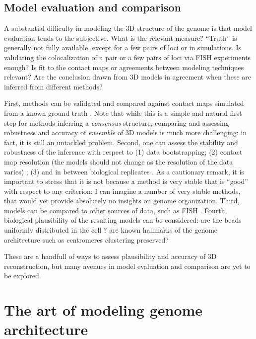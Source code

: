 \documentclass[2columns]{article}
\begin{document}
\subsection*{Model evaluation and comparison}

A substantial difficulty in modeling the 3D structure of the genome is that
model evaluation tends to the subjective. What is the relevant measure?
``Truth'' is generally not fully available, except for a few pairs of loci or
in simulations. Is validating the colocalization of a pair or a few pairs of
loci via FISH experiments enough? Is fit to the contact maps or agreements
between modeling techniques relevant? Are the conclusion drawn from 3D models
in agreement when these are inferred from different methods?

First, methods can be validated and compared against contact maps simulated
from a known ground truth \citep{zhang:inference, varoquaux:statistical,
lesne:3d, trieu:3D}. Note that while this is a simple and natural first step
for methods inferring a \textit{consensus} structure, comparing and assessing
robustness and accuracy of {\em ensemble} of 3D models is much more
challenging: in fact, it is still an untackled problem. Second, one can assess
the stability and robustness of the inference with respect to (1) data
bootstrapping; (2) contact map resolution (the models should not change as the
resolution of the data varies) \citep{zhang:inference, varoquaux:statistical};
(3) and in between biological replicates \citep{zhang:inference,
varoquaux:statistical}. As a cautionary remark, it is important to stress that
it is not because a method is very stable that is ``good'' with respect to any
criterion: I can imagine a number of very stable methods, that would yet
provide absolutely no insights on genome organization. Third, models can be
compared to other sources of data, such as FISH
\citep{ay:three-dimensional,duan:three-dimensional}. Fourth, biological
plausibility of the resulting models can be considered: are the beads
uniformly distributed in the cell \citep{ay:three-dimensional}? are known
hallmarks of the genome architecture such as centromeres clustering preserved?

These are a handfull of ways to assess plausibility and accuracy of 3D
reconstruction, but many avenues in model evaluation and comparison are yet to
be explored.

\section*{The art of modeling genome architecture}
\end{document}
